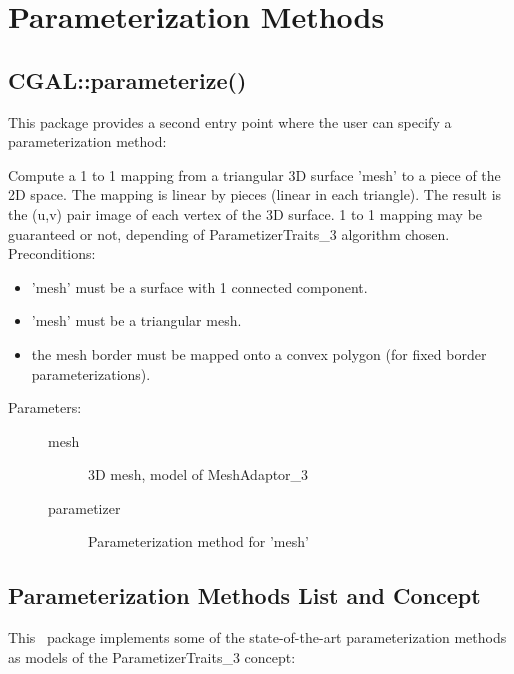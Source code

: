 \section{Parameterization Methods}


\subsection{CGAL::parameterize()}

This package provides a second  entry point
where the user can specify a parameterization method:

{
Compute a 1 to 1 mapping from a triangular 3D surface 'mesh' to a piece of the 2D space. The mapping is linear by pieces (linear in each triangle). The result is the (u,v) pair image of each vertex of the 3D surface.
1 to 1 mapping may be guaranteed or not, depending of ParametizerTraits\_3 algorithm chosen.
Preconditions:\begin{itemize}
\item 'mesh' must be a surface with 1 connected component.\item 'mesh' must be a triangular mesh.\item the mesh border must be mapped onto a convex polygon (for fixed border parameterizations).\end{itemize}
}
\begin{description}
\item[Parameters: ]
\begin{description}
\item[mesh]3D mesh, model of MeshAdaptor\_3 \item[parametizer]Parameterization method for 'mesh' \end{description}
\end{description}


\subsection{Parameterization Methods List and Concept}

This \cgal\ package implements some of the state-of-the-art
parameterization methods as models of the ParametizerTraits\_3 concept:

